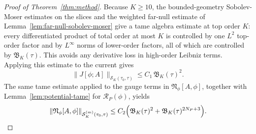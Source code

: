 \documentclass[11pt]{article}
\numberwithin{equation}{section}
\theoremstyle{plain}
\theoremstyle{definition}
\theoremstyle{remark}
\begin{document}
\begin{proof}[Proof of Theorem~\ref{thm:method}]
Because $K\ge10$, the bounded-geometry Sobolev-Moser estimates on the slices and the weighted far-null estimate of Lemma~\ref{lem:far-null-sobolev-moser} give a tame algebra estimate at top order $K$: every differentiated product of total order at most $K$ is controlled by one $L^{2}$ top-order factor and by $L^{\infty}$ norms of lower-order factors, all of which are controlled by $\mathfrak B_K(\tau)$. This avoids any derivative loss in high-order Leibniz terms. Applying this estimate to the current gives
\begin{equation}\label{eq:method-current-bound}
\|J[\phi;A]\|_{\mathcal S_{K}(\tau_{0},\tau)}
\le
C_{1}\,\mathfrak B_{K}(\tau)^{2}.
\end{equation}
The same tame estimate applied to the gauge terms in $\mathfrak N_{\phi}[A,\phi]$, together with Lemma~\ref{lem:potential-tame} for $\mathcal R_{P}(\phi)$, yields
\begin{equation}\label{eq:method-scalar-source-bound}
\|\mathfrak N_{\phi}[A,\phi]\|_{\mathcal S_{K}^{(m)}(\tau_{0},\tau)}
\le
C_{2}\Bigl(\mathfrak B_{K}(\tau)^{2}+\mathfrak B_{K}(\tau)^{2N_{P}+3}\Bigr).
\end{equation}


\end{proof}
\end{document}
